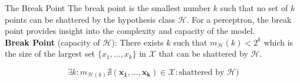 \begin{definitionbox}{The Break Point}
    The break point is the smallest number \( k \) such that no set of \( k \) points can be shattered by the hypothesis class \( \mathcal{H} \). For a perceptron, the break point provides insight into the complexity and capacity of the model.\\

    \textbf{Break Point} (capacity of \(\mathcal{H}\)): There exists \( k \) such that \( m_{\mathcal{H}}(k) < 2^k \) which is the size of the largest set \( \{x_1, \ldots, x_k\} \) in \(\mathcal{X}\) that can be shattered by \(\mathcal{H}\).

    \[\exists k:m_{\mathcal{H}(k)}\nexists(\mathbf{x_1},\ldots,\mathbf{x_k})\in\mathcal{X}:\text{shattered by }\mathcal{H})\]

\end{definitionbox}

